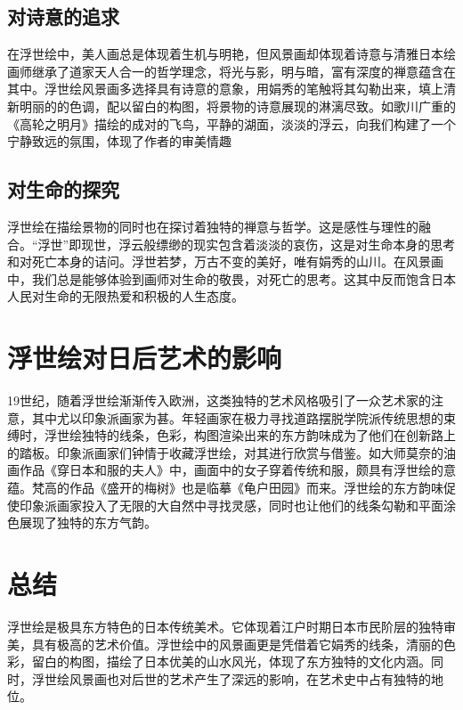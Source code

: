 \documentclass{ctexart}
\begin{document}
\subsection{对诗意的追求}
在浮世绘中，美人画总是体现着生机与明艳，但风景画却体现着诗意与清雅\cite{对日本浮世绘之探析}日本绘画师继承了道家天人合一的哲学理念，将光与影，明与暗，富有深度的禅意蕴含在其中。浮世绘风景画多选择具有诗意的意象，用娟秀的笔触将其勾勒出来，填上清新明丽的的色调，配以留白的构图，将景物的诗意展现的淋漓尽致。如歌川广重的《高轮之明月》描绘的成对的飞鸟，平静的湖面，淡淡的浮云，向我们构建了一个宁静致远的氛围，体现了作者的审美情趣
\subsection{对生命的探究}
浮世绘在描绘景物的同时也在探讨着独特的禅意与哲学。这是感性与理性的融合。“浮世”即现世，浮云般缥缈的现实包含着淡淡的哀伤，这是对生命本身的思考和对死亡本身的诘问。浮世若梦，万古不变的美好，唯有娟秀的山川。在风景画中，我们总是能够体验到画师对生命的敬畏，对死亡的思考。这其中反而饱含日本人民对生命的无限热爱和积极的人生态度。\cite{日本浮世绘版画的艺术美感及其文化内涵}
\section{浮世绘对日后艺术的影响 }
19世纪，随着浮世绘渐渐传入欧洲，这类独特的艺术风格吸引了一众艺术家的注意，其中尤以印象派画家为甚。年轻画家在极力寻找道路摆脱学院派传统思想的束缚时，浮世绘独特的线条，色彩，构图渲染出来的东方韵味成为了他们在创新路上的踏板。\cite{浮世魅影}印象派画家们钟情于收藏浮世绘，对其进行欣赏与借鉴。如大师莫奈的油画作品《穿日本和服的夫人》中，画面中的女子穿着传统和服，颇具有浮世绘的意蕴。梵高的作品《盛开的梅树》也是临摹《龟户田园》而来。浮世绘的东方韵味促使印象派画家投入了无限的大自然中寻找灵感，同时也让他们的线条勾勒和平面涂色展现了独特的东方气韵。
\section{总结}
浮世绘是极具东方特色的日本传统美术。它体现着江户时期日本市民阶层的独特审美，具有极高的艺术价值。浮世绘中的风景画更是凭借着它娟秀的线条，清丽的色彩，留白的构图，描绘了日本优美的山水风光，体现了东方独特的文化内涵。同时，浮世绘风景画也对后世的艺术产生了深远的影响，在艺术史中占有独特的地位。

\end{document}
